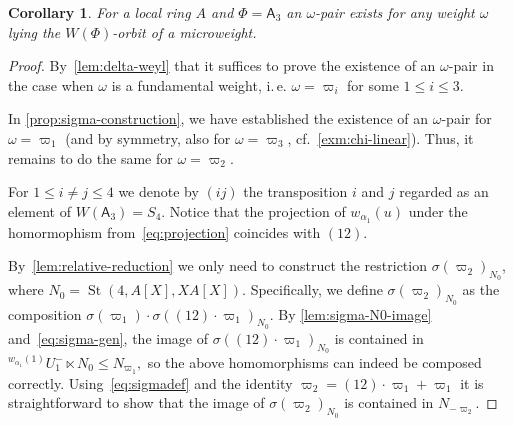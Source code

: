\documentclass[oneside, 10pt]{amsart}
\DeclareMathOperator{\St}{St}
\newcommand{\rA}{\mathsf{A}}
\numberwithin{equation}{section}
\numberwithin{thm}{section}
\numberwithin{lemma}{section}
\newtheorem{cor}[thm]{Corollary}
\theoremstyle{definition}
\theoremstyle{remark}
\begin{document}
\begin{cor} \label{cor:a3-microweight}
For a local ring $A$ and $\Phi = \rA_3$ an $\omega$-pair exists for any weight $\omega$ lying the $W(\Phi)$-orbit of a microweight.
\end{cor}
\begin{proof}
By~\cref{lem:delta-weyl} that it suffices to prove the existence of an $\omega$-pair in the case when $\omega$ is a fundamental weight, i.\,e. $\omega = \varpi_{i}$ for some $1 \leq i \leq 3$.

In \cref{prop:sigma-construction}, we have established the existence of an $\omega$-pair for $\omega = \varpi_1$
(and by symmetry, also for $\omega = \varpi_3$, cf.~\cref{exm:chi-linear}).
Thus, it remains to do the same for $\omega = \varpi_{2}$.

For $1\leq i \neq j \leq 4$ we denote by $(ij)$ the transposition $i$ and $j$ regarded as an element of $W(\rA_3) = S_4$.
Notice that the projection of $w_{\alpha_1}(u)$ under the homormophism from~\eqref{eq:projection}
 coincides with $(12)$.

By~\cref{lem:relative-reduction} we only need to construct the restriction $\sigma(\varpi_2)_{N_0}$, where $N_0 = \St(4, A[X], XA[X])$.
Specifically, we define $\sigma(\varpi_2)_{N_0}$ as the composition
$\sigma(\varpi_1) \cdot \sigma((12) \cdot \varpi_1)_{N_0}$.
By \cref{lem:sigma-N0-image} and~\eqref{eq:sigma-gen}, the image of $\sigma((12) \cdot \varpi_1)_{N_0}$ is contained in
${}^{w_{\alpha_1}(1)}U_1^- \ltimes N_0 \leq N_{\varpi_1},$ so the above homomorphisms can indeed be composed correctly.
Using~\eqref{eq:sigmadef} and the identity
$\varpi_2 = (12) \cdot \varpi_1 + \varpi_1$ it is straightforward to show that the image of $\sigma(\varpi_2)_{N_0}$ is contained in $N_{-\varpi_2}$.
\end{proof}
\end{document}
